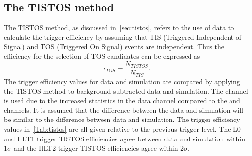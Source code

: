\subsection{The TISTOS method}
The TISTOS method, as discussed in~\autoref{sec:tistos}, refers to the use of data to calculate the trigger efficiency by assuming that TIS (Triggered Independent of Signal) and TOS (Triggered On Signal) events are independent. 
Thus the efficiency for the selection of TOS candidates can be expressed as
\begin{equation}
  \epsilon_{TOS}  = \frac{N_{TISTOS}}{N_{TIS}}.
\end{equation}
The trigger efficiency values for data and simulation  are compared by applying the TISTOS method to background-subtracted \LbKjpsi data and \LbKjpsi simulation. The \LbKjpsi channel is used due to the increased statistics in the \LbKjpsi data channel compared to the \Lbpijpsi and \Lbpi channels.  It is assumed that the difference between the \LbKjpsi data and simulation will be similar to the difference between \Lbpi data and simulation.  The trigger efficiency values in~\autoref{Tab:tistos} are all given relative to the previous trigger level. %
The L0 and HLT1 trigger TISTOS efficiencies agree between data and simulation within 1$\sigma$ and the HLT2 trigger TISTOS efficiencies agree within 2$\sigma$.


